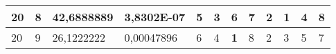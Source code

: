 \documentclass[conference]{IEEEtran}
\begin{document}
\begin{table*}[]
\begin{tabular}{|llll|llllllll|}
\multicolumn{1}{|l|}{20}                                                    & \multicolumn{1}{l|}{8}                                                        & \multicolumn{1}{l|}{42,6888889}                                                   & 3,8302E-07                     & \multicolumn{1}{l|}{5}                                                  & \multicolumn{1}{l|}{3}                                                  & \multicolumn{1}{l|}{6}                                                  & \multicolumn{1}{l|}{7}                                                  & \multicolumn{1}{l|}{2}                                                  & \multicolumn{1}{l|}{\textbf{1}}                                         & \multicolumn{1}{l|}{4}                                                  & 8                          \\ \hline
\multicolumn{1}{|l|}{20}                                                    & \multicolumn{1}{l|}{9}                                                        & \multicolumn{1}{l|}{26,1222222}                                                   & 0,00047896                     & \multicolumn{1}{l|}{6}                                                  & \multicolumn{1}{l|}{4}                                                  & \multicolumn{1}{l|}{\textbf{1}}                                         & \multicolumn{1}{l|}{8}                                                  & \multicolumn{1}{l|}{2}                                                  & \multicolumn{1}{l|}{3}                                                  & \multicolumn{1}{l|}{5}                                                  & 7                          \\ \hline
\end{tabular}
\end{table*}
\end{document}
